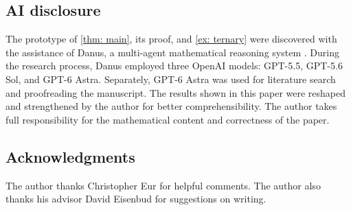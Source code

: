 \documentclass[11pt,reqno]{amsart}
\begin{document}
\begin{abstract}

\end{abstract}
\maketitle

\subsection*{AI disclosure} The prototype of \cref{thm: main}, its proof, and \cref{ex: ternary} were discovered with the assistance of Danus, a multi-agent mathematical reasoning system \cite{LGS+26}. During the research process, Danus employed three OpenAI models: GPT-5.5, GPT-5.6 Sol, and GPT-6 Astra. Separately, GPT-6 Astra was used for literature search and proofreading the manuscript. The results shown in this paper were reshaped and strengthened by the author for better comprehensibility. The author takes full responsibility for the mathematical content and correctness of the paper.

\subsection*{Acknowledgments} The author thanks Christopher Eur for helpful comments. The author also thanks his advisor David Eisenbud for suggestions on writing.








\end{document}
